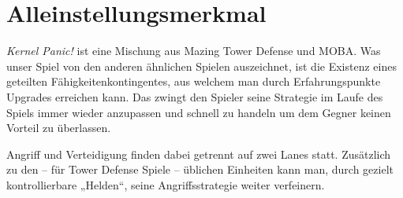 \section{Alleinstellungsmerkmal}


\textit{Kernel Panic!} ist eine Mischung aus Mazing Tower Defense und MOBA.
Was unser Spiel von den anderen ähnlichen Spielen auszeichnet, ist die Existenz
eines geteilten Fähigkeitenkontingentes, aus welchem man durch Erfahrungspunkte Upgrades erreichen kann. Das zwingt den Spieler seine Strategie im Laufe des Spiels immer wieder anzupassen und schnell zu handeln um dem Gegner keinen Vorteil zu überlassen.

Angriff und Verteidigung finden dabei getrennt auf zwei Lanes statt.
Zusätzlich zu den -- für Tower Defense Spiele -- üblichen Einheiten kann man, durch gezielt kontrollierbare „Helden“, seine Angriffsstrategie weiter verfeinern.